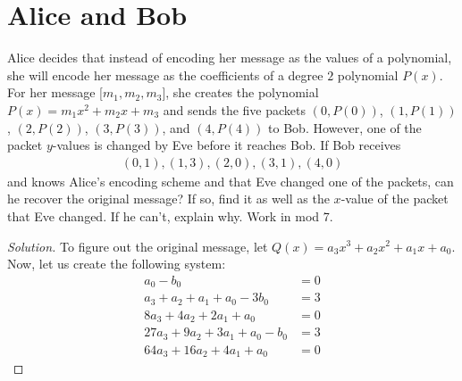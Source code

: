 \documentclass{article}
\newenvironment{solution}{\begin{proof}[Solution]}{\end{proof}}
\begin{document}
\newpage

\section{Alice and Bob}
\begin{hw}
	Alice decides that instead of encoding her message as the values of a polynomial, she will encode her message as the coefficients of a degree $2$ polynomial $P(x)$. For her message [$m_1, m_2, m_3$], she creates the polynomial $P(x) = m_1x^2 + m_2x + m_3$ and sends the five packets $(0, P(0))$, $(1, P(1))$, $(2, P(2))$, $(3, P(3))$, and $(4, P(4))$ to Bob. However, one of the packet $y$-values is changed by Eve before it reaches Bob. If Bob receives
	\begin{align*}
		(0, 1), (1, 3), (2, 0), (3, 1), (4, 0)
	\end{align*}
	and knows Alice's encoding scheme and that Eve changed one of the packets, can he recover the original message? If so, find it as well as the $x$-value of the packet that Eve changed. If he can't, explain why. Work in mod 7.
\end{hw}
\begin{solution}
%
%	
	
	To figure out the original message, let $Q(x) = a_{3}x^{3} + a_{2}x^{2} + a_{1}x + a_{0}$. Now, let us create the following system:
	\begin{align*}
		a_{0} - b_{0} &= 0 \\
		a_{3} + a_{2} + a_{1} + a_{0} - 3b_{0} &= 3 \\
		8a_{3} + 4a_{2} + 2a_{1} + a_{0} &= 0 \\
		27a_{3} + 9a_{2} + 3a_{1} + a_{0} - b_{0} &= 3 \\
		64a_{3} + 16a_{2} + 4a_{1} + a_{0} &= 0
	\end{align*}
\end{solution}
\end{document}
